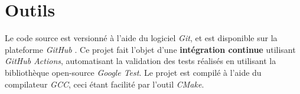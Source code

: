 \section{Outils}

Le code source est versionné à l'aide du logiciel \textit{Git}, et est disponible sur la plateforme \textit{GitHub} \cite{Leroy_2024}. Ce projet fait l'objet d'une \textbf{intégration continue} utilisant \textit{GitHub Actions}, automatisant la validation des tests réalisés en utilisant la bibliothèque open-source \textit{Google Test}. Le projet est compilé à l'aide du compilateur \textit{GCC}, ceci étant facilité par l'outil \textit{CMake}.